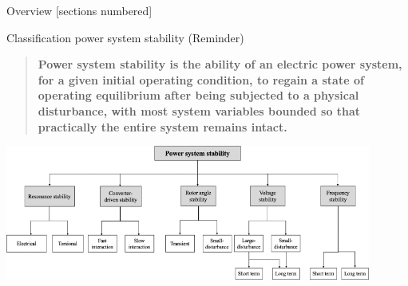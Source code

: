 \titleframe

\begin{frame}{Overview}
  [sections numbered]
  \tableofcontents[hideallsubsections]
\end{frame}


\begin{frame}[allowframebreaks]{Classification power system stability (Reminder)}
\begin{quote}
    \textbf{Power system stability is the ability of an electric power system, for a given initial operating condition, to regain a state of operating equilibrium after being subjected to a physical disturbance, with most system variables bounded so that practically the entire system remains intact.} 
    \cite{hatziargyriou2020definition}
\end{quote}
\vspace{0.5cm}
\begin{center}
\includegraphics[width=0.9\textwidth]{images/ClassificationStability.png}
\end{center}
\end{frame}

